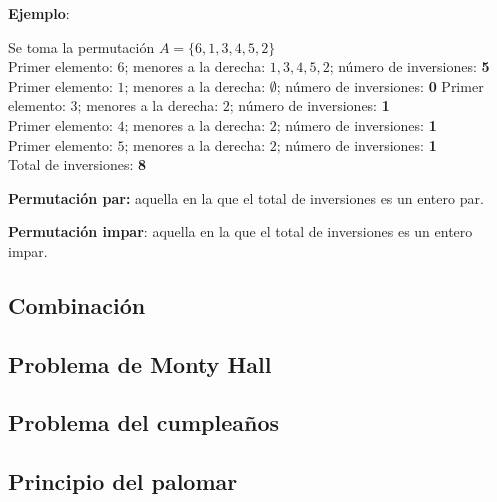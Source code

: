 \textbf{Ejemplo}:

Se toma la permutación \textbf{$A=\{6,1,3,4,5,2\}$}\\

Primer elemento: $6$; menores a la derecha: $1,3,4,5,2$; n\'umero de
inversiones: \textbf{5}
Primer elemento: $1$; menores a la derecha: $\emptyset$; n\'umero de
inversiones: \textbf{0}
Primer elemento: $3$; menores a la derecha: $2$; n\'umero de inversiones:
\textbf{1}\\
Primer elemento: $4$; menores a la derecha: $2$; n\'umero de inversiones:
\textbf{1}\\
Primer elemento: $5$; menores a la derecha: $2$; n\'umero de inversiones:
\textbf{1}\\

Total de inversiones: \textbf{8}
\begin{tcolorbox}[colback=blue!5!white,colframe=blue!60!black,title=Definición: Tipos de permutaciones]
	\textbf{Permutaci\'on par:} aquella en la que el total de inversiones es un
	entero par.
	
	\tcblower

	\textbf{Permutaci\'on impar}: aquella en la que el total de inversiones es un
	entero impar.
	
\end{tcolorbox}

\subsection{Combinación}

\subsection{Problema de Monty Hall}

\subsection{Problema del cumpleaños}

\subsection{Principio del palomar}
